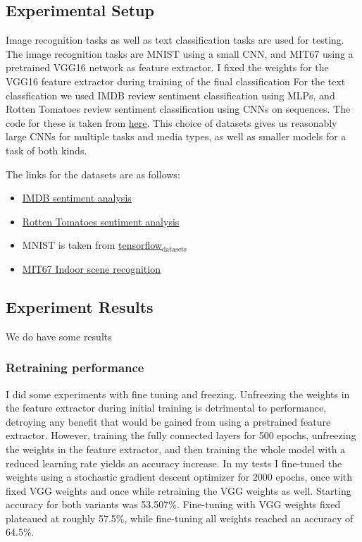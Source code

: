 \documentclass[11pt]{article}
\begin{document}
\subsection{Experimental Setup}
\label{sec:org389eb24}
\label{org038acad}

Image recognition tasks as well as text classification tasks are used for testing.
The image recognition tasks are MNIST using a small CNN, and MIT67 using a pretrained VGG16 network as feature extractor.
I fixed the weights for the VGG16 feature extractor during training of the final classification 
For the text classfication we used IMDB review sentiment classification using MLPs, and Rotten Tomatoes review sentiment classification using CNNs on sequences.
The code for these is taken from \href{https://github.com/google/eng-edu/tree/master/ml/guides/text\_classification}{here}.
This choice of datasets gives us reasonably large CNNs for multiple tasks and media types, as well as smaller models for a task of both kinds.

The links for the datasets are as follows:
\begin{itemize}
\item \href{http://ai.stanford.edu/\~amaas/data/sentiment/aclImdb\_v1.tar.gz}{IMDB sentiment analysis}
\item \href{https://www.kaggle.com/c/3810/download/train.tsv.zip}{Rotten Tomatoes sentiment analysis}
\item MNIST is taken from \href{https://blog.tensorflow.org/2019/02/introducing-tensorflow-datasets.html}{tensorflow\(_{\text{datasets}}\)}
\item \href{https://web.mit.edu/torralba/www/indoor.html}{MIT67 Indoor scene recognition}
\end{itemize}

\subsection{Experiment Results}
\label{sec:org7b10e88}
\label{org53997ba}

We do have some results

\subsubsection{Retraining performance}
\label{sec:orgb7875f4}
I did some experiments with fine tuning and freezing.
Unfreezing the weights in the feature extractor during initial training is detrimental to performance, detroying any benefit that would be gained from using a pretrained feature extractor.
However, training the fully connected layers for 500 epochs, unfreezing the weights in the feature extractor, and then training the whole model with a reduced learning rate yields an accuracy increase.
In my tests I fine-tuned the weights using a stochastic gradient descent optimizer for 2000 epochs, once with fixed VGG weights and once while retraining the VGG weights as well.
Starting accuracy for both variants was 53.507\%.
Fine-tuning with VGG weights fixed plateaued at roughly 57.5\%, while fine-tuning all weights reached an accuracy of 64.5\%.
\end{document}
